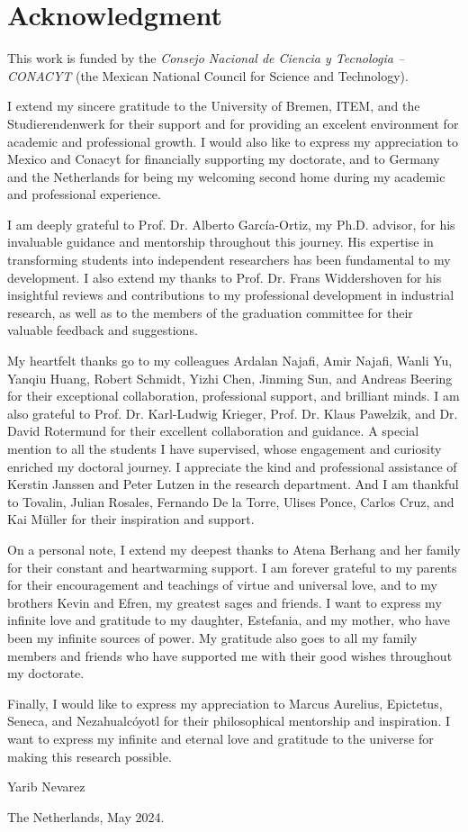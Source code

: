 \chapter*{Acknowledgment}
\thispagestyle{empty}
This work is funded by the \textit{Consejo Nacional de Ciencia y Tecnologia -- CONACYT} (the Mexican National Council for Science and Technology).

I extend my sincere gratitude to the University of Bremen, ITEM, and the Studierendenwerk for their support and for providing an excelent environment for academic and professional growth. I would also like to express my appreciation to Mexico and Conacyt for financially supporting my doctorate, and to Germany and the Netherlands for being my welcoming second home during my academic and professional experience.

I am deeply grateful to Prof. Dr. Alberto Garc\'ia-Ortiz, my Ph.D. advisor, for his invaluable guidance and mentorship throughout this journey. His expertise in transforming students into independent researchers has been fundamental to my development. I also extend my thanks to Prof. Dr. Frans Widdershoven for his insightful reviews and contributions to my professional development in industrial research, as well as to the members of the graduation committee for their valuable feedback and suggestions.

My heartfelt thanks go to my colleagues Ardalan Najafi, Amir Najafi, Wanli Yu, Yanqiu Huang, Robert Schmidt, Yizhi Chen, Jinming Sun, and Andreas Beering for their exceptional collaboration, professional support, and brilliant minds. I am also grateful to Prof. Dr. Karl-Ludwig Krieger, Prof. Dr. Klaus Pawelzik, and Dr. David Rotermund for their excellent collaboration and guidance. A special mention to all the students I have supervised, whose engagement and curiosity enriched my doctoral journey. I appreciate the kind and professional assistance of Kerstin Janssen and Peter Lutzen in the research department. And I am thankful to Tovalin, Julian Rosales, Fernando De la Torre, Ulises Ponce, Carlos Cruz, and Kai M\"uller for their inspiration and support.

On a personal note, I extend my deepest thanks to Atena Berhang and her family for their constant and heartwarming support. I am forever grateful to my parents for their encouragement and teachings of virtue and universal love, and to my brothers Kevin and Efren, my greatest sages and friends. I want to express my infinite love and gratitude to my daughter, Estefania, and my mother, who have been my infinite sources of power. My gratitude also goes to all my family members and friends who have supported me with their good wishes throughout my doctorate. 

Finally, I would like to express my appreciation to Marcus Aurelius, Epictetus, Seneca, and Nezahualc\'oyotl for their philosophical mentorship and inspiration. I want to express my infinite and eternal love and gratitude to the universe for making this research possible.

Yarib Nevarez

The Netherlands, May 2024.

